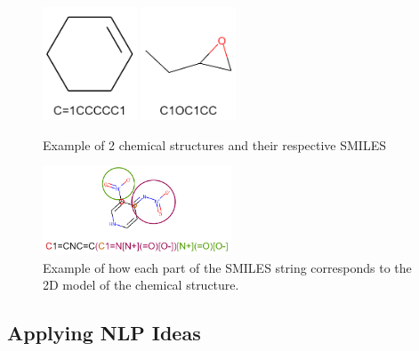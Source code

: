     \begin{figure}[h]
        \centering
        \includegraphics[width=0.25\textwidth]{figures/Smiles-Smile1.png}
        \includegraphics[width=0.25\textwidth]{figures/Smiles-Smile2.png}
        \caption{Example of 2 chemical structures and their respective SMILES}
        \label{fig:smile-examples}
    \end{figure}
    \begin{figure}[h]
        \centering
        \includegraphics[width=0.5\textwidth]{figures/Smiles-Smile3.png}
        \caption{Example of how each part of the SMILES string corresponds to the 2D model of the chemical structure.}
        \label{fig:smile-examples2}
    \end{figure}
\subsection{Applying NLP Ideas}
